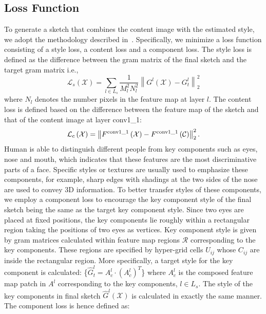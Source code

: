\documentclass[10pt,twocolumn,letterpaper]{article}
\begin{document}
{
\subsection{Loss Function}
}
To generate a sketch that combines the content image with the estimated style, we adopt the methodology described in~\cite{gatys2015texture}. Specifically, we minimize a loss function consisting of a style loss, a content loss and a component loss. The style loss is defined as the difference between the gram matrix of the final sketch and the target gram matrix i.e.,
\begin{equation}
\mathcal{L}_{s} \left( \mathcal{X} \right) = \sum\limits_{l \in {L_s}} {\frac{1}{{M_l^2N_l^2}}\left\| {{G^l}\left( \mathcal{X} \right) - G_t^l} \right\|_2^2} 
\label{eq:Gram_loss}
\end{equation}
where $N_l$ denotes the number pixels in the feature map at layer $l$. The content loss is defined based on the difference between the feature map of the sketch and that of the content image at layer conv1\_1:
\begin{equation}
\mathcal{L}_{c}\left( \mathcal{X} \right) = \left\| {{F^{\rm{conv1\_1}}}\left( \mathcal{X} \right) - {F^{\rm{conv1\_1}}}\left( \mathcal{C} \right)} \right\|_2^2.
\label{eq:Style_loss}
\end{equation}
Human is able to distinguish different people from key components such as eyes, nose and mouth, which indicates that these features are the most discriminative parts of a face. Specific styles or textures are usually used to emphasize these components, for example, sharp edges with shadings at the two sides of the nose are used to convey 3D information. To better transfer styles of these components, we employ a component loss to encourage the key component style of the final sketch being the same as the target key component style. Since two eyes are placed at fixed positions, the key components lie roughly within a rectangular region taking the positions of two eyes as vertices. Key component style is given by gram matrices calculated within feature map regions $\mathcal R$ corresponding to the key components. These regions are specified by hyper-grid cells $U_{ij}$ whose $C_{ij}$ are inside the rectangular region. More specifically, a target style for the key component is calculated: \{${\hat G}_{t}^l ={A}_{c}^l \cdot {\left( {{{A}_{c}^l}} \right)^T}$\} where ${A}_{c}^l$ is the composed feature map patch in $A^{l}$ corresponding to the key components, $l\in L_s$. The style of the key components in final sketch ${\hat G}^l\left( \mathcal{X} \right) $ is calculated in exactly the same manner. The component loss is hence defined as:
\end{document}
